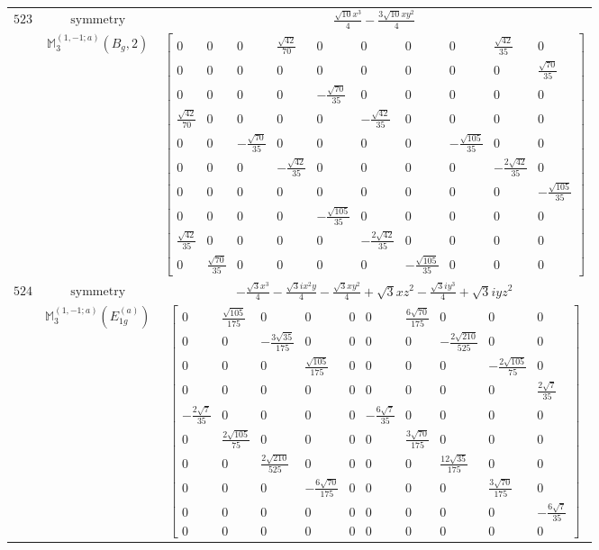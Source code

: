 \documentclass[fleqn,8pt,landscape]{jsarticle}
\begin{document}
\begin{longtable}{ccc}
$ 523 $ & $ \text{symmetry} $ & $ \frac{\sqrt{10} x^{3}}{4} - \frac{3 \sqrt{10} x y^{2}}{4} $ \\
$  $ & $ \mathbb{M}_{3}^{(1,-1;a)}(B_{g},2) $ & $ \begin{bmatrix} 0 & 0 & 0 & \frac{\sqrt{42}}{70} & 0 & 0 & 0 & 0 & \frac{\sqrt{42}}{35} & 0 \\ 0 & 0 & 0 & 0 & 0 & 0 & 0 & 0 & 0 & \frac{\sqrt{70}}{35} \\ 0 & 0 & 0 & 0 & - \frac{\sqrt{70}}{35} & 0 & 0 & 0 & 0 & 0 \\ \frac{\sqrt{42}}{70} & 0 & 0 & 0 & 0 & - \frac{\sqrt{42}}{35} & 0 & 0 & 0 & 0 \\ 0 & 0 & - \frac{\sqrt{70}}{35} & 0 & 0 & 0 & 0 & - \frac{\sqrt{105}}{35} & 0 & 0 \\ 0 & 0 & 0 & - \frac{\sqrt{42}}{35} & 0 & 0 & 0 & 0 & - \frac{2 \sqrt{42}}{35} & 0 \\ 0 & 0 & 0 & 0 & 0 & 0 & 0 & 0 & 0 & - \frac{\sqrt{105}}{35} \\ 0 & 0 & 0 & 0 & - \frac{\sqrt{105}}{35} & 0 & 0 & 0 & 0 & 0 \\ \frac{\sqrt{42}}{35} & 0 & 0 & 0 & 0 & - \frac{2 \sqrt{42}}{35} & 0 & 0 & 0 & 0 \\ 0 & \frac{\sqrt{70}}{35} & 0 & 0 & 0 & 0 & - \frac{\sqrt{105}}{35} & 0 & 0 & 0 \end{bmatrix} $ \\ \hline
$ 524 $ & $ \text{symmetry} $ & $ - \frac{\sqrt{3} x^{3}}{4} - \frac{\sqrt{3} i x^{2} y}{4} - \frac{\sqrt{3} x y^{2}}{4} + \sqrt{3} x z^{2} - \frac{\sqrt{3} i y^{3}}{4} + \sqrt{3} i y z^{2} $ \\
$  $ & $ \mathbb{M}_{3}^{(1,-1;a)}(E_{1g}^{(a)}) $ & $ \begin{bmatrix} 0 & \frac{\sqrt{105}}{175} & 0 & 0 & 0 & 0 & \frac{6 \sqrt{70}}{175} & 0 & 0 & 0 \\ 0 & 0 & - \frac{3 \sqrt{35}}{175} & 0 & 0 & 0 & 0 & - \frac{2 \sqrt{210}}{525} & 0 & 0 \\ 0 & 0 & 0 & \frac{\sqrt{105}}{175} & 0 & 0 & 0 & 0 & - \frac{2 \sqrt{105}}{75} & 0 \\ 0 & 0 & 0 & 0 & 0 & 0 & 0 & 0 & 0 & \frac{2 \sqrt{7}}{35} \\ - \frac{2 \sqrt{7}}{35} & 0 & 0 & 0 & 0 & - \frac{6 \sqrt{7}}{35} & 0 & 0 & 0 & 0 \\ 0 & \frac{2 \sqrt{105}}{75} & 0 & 0 & 0 & 0 & \frac{3 \sqrt{70}}{175} & 0 & 0 & 0 \\ 0 & 0 & \frac{2 \sqrt{210}}{525} & 0 & 0 & 0 & 0 & \frac{12 \sqrt{35}}{175} & 0 & 0 \\ 0 & 0 & 0 & - \frac{6 \sqrt{70}}{175} & 0 & 0 & 0 & 0 & \frac{3 \sqrt{70}}{175} & 0 \\ 0 & 0 & 0 & 0 & 0 & 0 & 0 & 0 & 0 & - \frac{6 \sqrt{7}}{35} \\ 0 & 0 & 0 & 0 & 0 & 0 & 0 & 0 & 0 & 0 \end{bmatrix} $ \\ \hline

\end{longtable}
\end{document}
